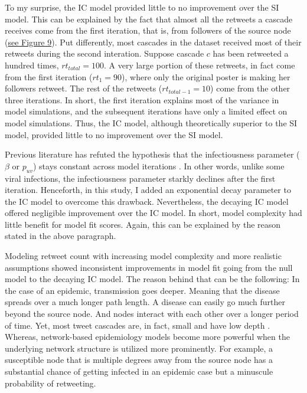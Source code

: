 \documentclass[11pt,a4paper]{article}
\begin{document}
    To my surprise, the IC model provided little to no improvement over the SI model. This can be explained by the fact that almost all the retweets a cascade receives come from the first iteration, that is, from followers of the source node (\hyperlink{fig:ecdf-vs-iter}{see Figure 9}). Put differently, most cascades in the dataset received most of their retweets during the second interation. Suppose cascade $c$ has been retweeted a hundred times, $rt_{total} = 100$. A very large portion of these retweets, in fact come from the first iteration ($rt_1 = 90$), where only the original poster is making her followers retweet. The rest of the retweets ($rt_{total-1} = 10$) come from the other three iterations. In short, the first iteration explains most of the variance in model simulations, and the subsequent iterations have only a limited effect on model simulations. Thus, the IC model, although theoretically superior to the SI model, provided little to no improvement over the SI model.
    
    Previous literature has refuted the hypothesis that the infectiousness parameter ($\beta$ or $p_{uv}$) stays constant across model iterations \cite{goel_note_2015}. In other words, unlike some viral infections, the infectiousness parameter starkly declines after the first iteration. Henceforth, in this study, I added an exponential decay parameter to the IC model to overcome this drawback. Nevertheless, the decaying IC model offered negligible improvement over the IC model. In short, model complexity had little benefit for model fit scores. Again, this can be explained by the reason stated in the above paragraph.
    
    Modeling retweet count with increasing model complexity and more realistic assumptions showed inconsistent improvements in model fit going from the null model to the decaying IC model. The reason behind that can be the following: In the case of an epidemic, transmission goes deeper. Meaning that the disease spreads over a much longer path length. A disease can easily go much further beyond the source node. And nodes interact with each other over a longer period of time. Yet, most tweet cascades are, in fact, small and have low depth \cite{goel_structural_2016}. Whereas, network-based epidemiology models become more powerful when the underlying network structure is utilized more prominently. For example, a susceptible node that is multiple degrees away from the source node has a substantial chance of getting infected in an epidemic case but a minuscule probability of retweeting.
\end{document}
